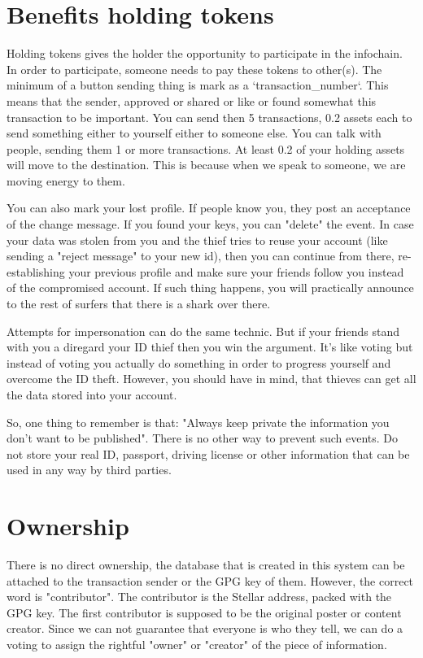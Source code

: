 \documentclass[10pt,a4paper]{paper}
\begin{document}
	\section{Benefits holding tokens}
	Holding tokens gives the holder the opportunity to participate in the infochain. In order to participate, someone needs to pay these tokens to other(s). The minimum of a button sending thing is mark as a `transaction\_number`. This means that the sender, approved or shared or like or found somewhat this transaction to be important. You can send then 5 transactions, 0.2 assets each to send something either to yourself either to someone else. You can talk with people, sending them 1 or more transactions. At least 0.2 of your holding assets will move to the destination. This is because when we speak to someone, we are moving energy to them.

	You can also mark your lost profile. If people know you, they post an acceptance of the change message. If you found your keys, you can "delete" the event. In case your data was stolen from you and the thief tries to reuse your account (like sending a "reject message" to your new id), then you can continue from there, re-establishing your previous profile and make sure your friends follow you instead of the compromised account. If such thing happens, you will practically announce to the rest of surfers that there is a shark over there.

	Attempts for impersonation can do the same technic. But if your friends stand with you a diregard your ID thief then you win the argument. It's like voting but instead of voting you actually do something in order to progress yourself and overcome the ID theft. However, you should have in mind, that thieves can get all the data stored into your account.
	
	So, one thing to remember is that: "Always keep private the information you don't want to be published". There is no other way to prevent such events. Do not store your real ID, passport, driving license or other information that can be used in any way by third parties.
	
	\section{Ownership}\label{ownership}
	
	There is no direct ownership, the database that is created in this system can be attached to the transaction sender or the GPG key of them. However, the correct word is "contributor". The contributor is the Stellar address, packed with the GPG key. The first contributor is supposed to be the original poster or content creator. Since we can not guarantee that everyone is who they tell, we can do a voting to assign the rightful "owner" or "creator" of the piece of information.
	
\end{document}

